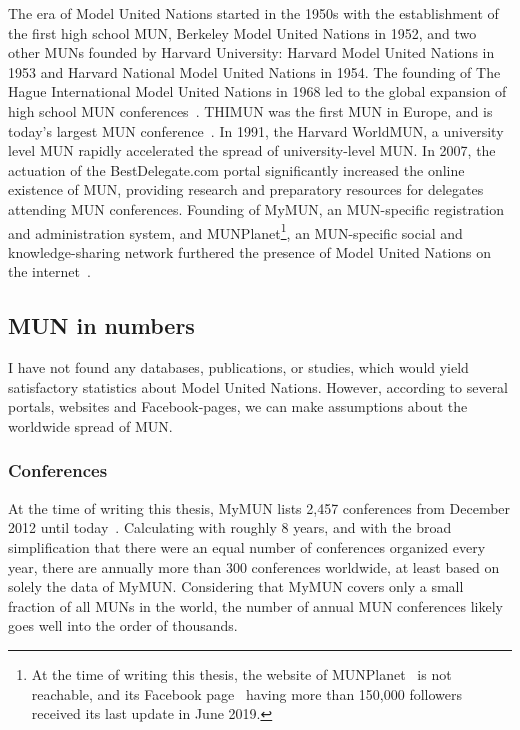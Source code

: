 The era of Model United Nations started in the 1950s with the establishment of the first high school MUN, Berkeley Model United Nations in 1952, and two other MUNs founded by Harvard University: Harvard Model United Nations in 1953 and Harvard National Model United Nations in 1954. The founding of The Hague International Model United Nations in 1968 led to the global expansion of high school MUN conferences~\cite{top10eventsofmun}. THIMUN was the first MUN in Europe, and is today's largest MUN conference~\cite{thimunabout}. In 1991, the Harvard WorldMUN, a university level MUN rapidly accelerated the spread of university-level MUN. In 2007, the actuation of the BestDelegate.com portal significantly increased the online existence of MUN, providing research and preparatory resources for delegates attending MUN conferences. Founding of MyMUN, an MUN-specific registration and administration system, and MUNPlanet\footnote{At the time of writing this thesis, the website of MUNPlanet~\cite{munplanetwebsite} is not reachable, and its Facebook page~\cite{munplanetfacebook} having more than 150,000 followers received its last update in June 2019.}, an MUN-specific social and knowledge-sharing network furthered the presence of Model United Nations on the internet~\cite{top10eventsofmun}.

\subsection{MUN in numbers}

I have not found any databases, publications, or studies, which would yield satisfactory statistics about Model United Nations. However, according to several portals, websites and Facebook-pages, we can make assumptions about the worldwide spread of MUN.

\subsubsection{Conferences}

At the time of writing this thesis, MyMUN lists 2,457 conferences from December 2012 until today~\cite{mymunconferencelist}. Calculating with roughly 8 years, and with the broad simplification that there were an equal number of conferences organized every year, there are annually more than 300 conferences worldwide, at least based on solely the data of MyMUN. Considering that MyMUN covers only a small fraction of all MUNs in the world, the number of annual MUN conferences likely goes well into the order of thousands.

